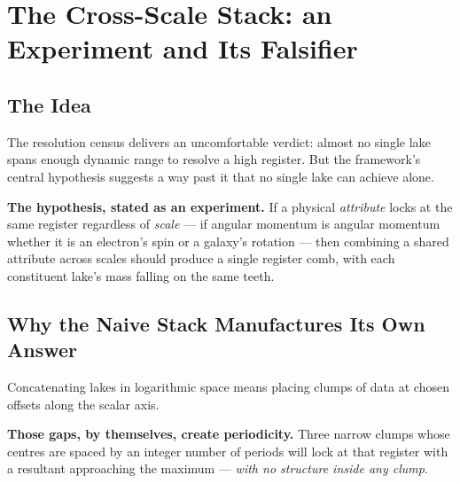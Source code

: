\documentclass[11pt, letterpaper, openany]{book}
\begin{document}
\chapter{The Cross-Scale Stack: an Experiment and Its Falsifier}

\section{The Idea}

The resolution census delivers an uncomfortable verdict: almost no single lake spans
enough dynamic range to resolve a high register. But the framework's central hypothesis suggests a
way past it that no single lake can achieve alone.

\begin{signalbox}
\textbf{The hypothesis, stated as an experiment.} If a physical \emph{attribute} locks at the same
register regardless of \emph{scale} --- if angular momentum is angular momentum whether it is an
electron's spin or a galaxy's rotation --- then combining a shared attribute across scales should
produce a single register comb, with each constituent lake's mass falling on the same teeth.
\end{signalbox}

\section{Why the Naive Stack Manufactures Its Own Answer}

Concatenating lakes in logarithmic space means placing clumps of data at chosen offsets along the
scalar axis. 

\begin{formbox}
\textbf{Those gaps, by themselves, create periodicity.} Three narrow clumps whose centres are
spaced by an integer number of periods will lock at that register with a resultant approaching the
maximum --- \emph{with no structure inside any clump}. 
\end{formbox}
\end{document}
